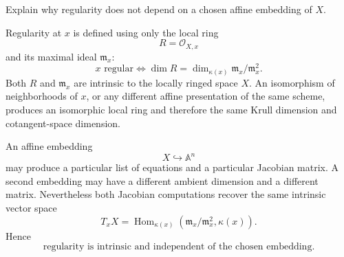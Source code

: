 \begin{problem}\label{prob:vi32-17}
Explain why regularity does not depend on a chosen affine embedding of \(X\).

\end{problem}

\ifdefined\FullProblemDossiers
\begin{solution}
Regularity at \(x\) is defined using only the local ring
\[
R=\mathcal O_{X,x}
\]
and its maximal ideal \(\mathfrak m_x\):
\[
x\text{ regular}
\iff
\dim R
=
\dim_{\kappa(x)}\mathfrak m_x/\mathfrak m_x^2.
\]
Both \(R\) and \(\mathfrak m_x\) are intrinsic to the locally ringed space \(X\). An isomorphism of neighborhoods of
\(x\), or any different affine presentation of the same scheme, produces an isomorphic local ring and therefore
the same Krull dimension and cotangent-space dimension.

An affine embedding
\[
X\hookrightarrow\mathbb A^n
\]
may produce a particular list of equations and a particular Jacobian matrix. A second embedding may have a
different ambient dimension and a different matrix. Nevertheless both Jacobian computations recover the same
intrinsic vector space
\[
T_xX
=
\operatorname{Hom}_{\kappa(x)}
(\mathfrak m_x/\mathfrak m_x^2,\kappa(x)).
\]
Hence
\[
\boxed{\text{regularity is intrinsic and independent of the chosen embedding}.}
\]
\end{solution}
\fi
